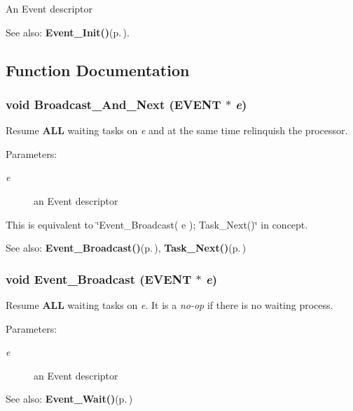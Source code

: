An Event descriptor \begin{Desc}
\item[See also:]{\bf Event\_\-Init()}{\rm (p.\,\pageref{os_8c_852c4f8ed9198c7c996cc5e9ce7f1f2b})}. \end{Desc}


\subsection{Function Documentation}
\subsubsection{\setlength{\rightskip}{0pt plus 5cm}void Broadcast\_\-And\_\-Next ({\bf EVENT} $\ast$ {\em e})}\label{os_8h_8530ed5f351b8835f3b060407bd68625}


Resume {\bf ALL} waiting tasks on {\em e\/} and at the same time relinquish the processor. 

\begin{Desc}
\item[Parameters:]
\begin{description}
\item[{\em e}]an Event descriptor\end{description}
\end{Desc}
This is equivalent to \char`\"{}Event\_\-Broadcast( e ); Task\_\-Next()\char`\"{} in concept. \begin{Desc}
\item[See also:]{\bf Event\_\-Broadcast()}{\rm (p.\,\pageref{os_8c_93f9686857f1f8cc4fe1585df3de4874})}, {\bf Task\_\-Next()}{\rm (p.\,\pageref{os_8c_5a9b72d0dadaea32fec8d4ff1c0eafa4})} \end{Desc}
\subsubsection{\setlength{\rightskip}{0pt plus 5cm}void Event\_\-Broadcast ({\bf EVENT} $\ast$ {\em e})}\label{os_8h_93f9686857f1f8cc4fe1585df3de4874}


Resume {\bf ALL} waiting tasks on {\em e\/}. It is a {\em no-op\/} if there is no waiting process. 

\begin{Desc}
\item[Parameters:]
\begin{description}
\item[{\em e}]an Event descriptor\end{description}
\end{Desc}
\begin{Desc}
\item[See also:]{\bf Event\_\-Wait()}{\rm (p.\,\pageref{os_8c_e279428ffa0e59261a01899cea931503})} \end{Desc}

